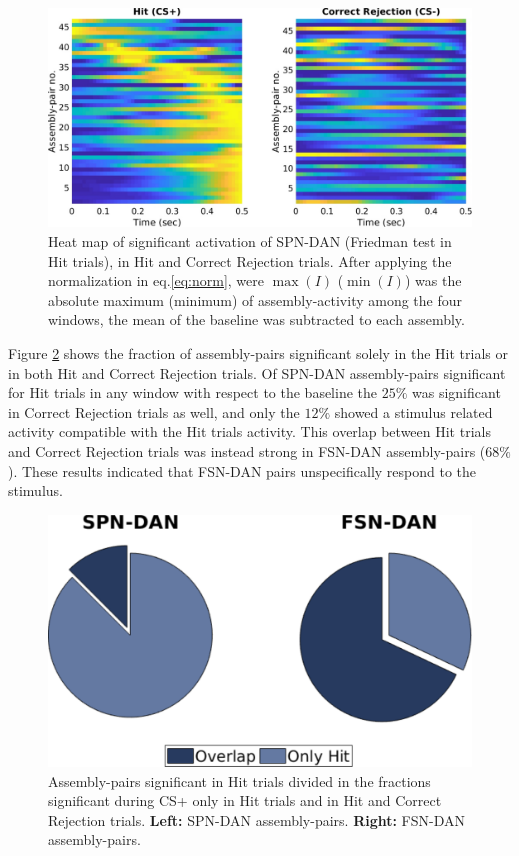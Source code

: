 \begin{figure}[H]
    \centering
    \includegraphics[scale=0.41]{figures/SD_HitCorrRejComp.pdf}
    \caption{Heat map of significant activation of SPN-DAN (Friedman test in Hit trials), in Hit and Correct Rejection trials. After applying the normalization in eq.\ref{eq:norm}, were $\max(I)$ ($\min(I)$) was the absolute maximum (minimum) of assembly-activity among the four windows, the mean of the baseline was subtracted to each assembly.}
    \label{fig:SD_HitCorrComp}
\end{figure}
Figure \ref{fig:Overlap} shows the fraction of assembly-pairs significant solely in the Hit trials or in both Hit and Correct Rejection trials. Of SPN-DAN assembly-pairs significant for Hit trials in any window  with respect to the baseline the $25\%$ was significant in Correct Rejection trials as well, and only the $12\%$ showed a stimulus related activity compatible with the Hit trials activity. This overlap between Hit trials and Correct Rejection trials was instead strong in FSN-DAN assembly-pairs ($68\%$). These results indicated that FSN-DAN pairs unspecifically respond to the stimulus. 
\begin{figure}[H]
    \centering
    \includegraphics[scale=0.5]{figures/HItCorrRejPieOverlapSD_FD.pdf}
    \caption{Assembly-pairs significant in Hit trials divided in the fractions significant during CS+ only in Hit trials and in Hit and Correct Rejection trials. \textbf{Left:} SPN-DAN assembly-pairs. \textbf{Right:} FSN-DAN assembly-pairs.}
    \label{fig:Overlap}
\end{figure}
